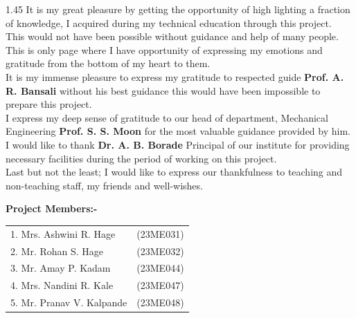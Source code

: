 \documentclass[12pt,a4paper]{article}
\begin{document}
\noindent
\begin{spacing}{1.45}
{\fontsize{11}{16}\selectfont
It is my great pleasure by getting the opportunity of high lighting a fraction of knowledge, I acquired during my technical education through this project.\\[3mm]
This would not have been possible without guidance and help of many people. This is only page where I have opportunity of expressing my emotions and gratitude from the bottom of my heart to them.\\[3mm]
It is my immense pleasure to express my gratitude to respected guide \textbf{Prof. A. R. Bansali} without his best guidance this would have been impossible to prepare this project.\\[3mm]
I express my deep sense of gratitude to our head of department, Mechanical Engineering \textbf{Prof. S. S. Moon} for the most valuable guidance provided by him.\\[3mm]
I would like to thank \textbf{Dr. A. B. Borade} Principal of our institute for providing necessary facilities during the period of working on this project.\\[3mm]
Last but not the least; I would like to express our thankfulness to teaching and non-teaching staff, my friends and well-wishes.
}
\end{spacing}

\vspace{8mm}
\noindent
\textbf{Project Members:-}\\[3mm]
\begin{tabular}{ll}
  1. Mrs. Ashwini R. Hage & (23ME031) \\
  2. Mr. Rohan S. Hage & (23ME032) \\
  3. Mr. Amay P. Kadam & (23ME044) \\
  4. Mrs. Nandini R. Kale & (23ME047) \\
  5. Mr. Pranav V. Kalpande & (23ME048)
\end{tabular}
\clearpage




\thispagestyle{empty}
\end{document}
